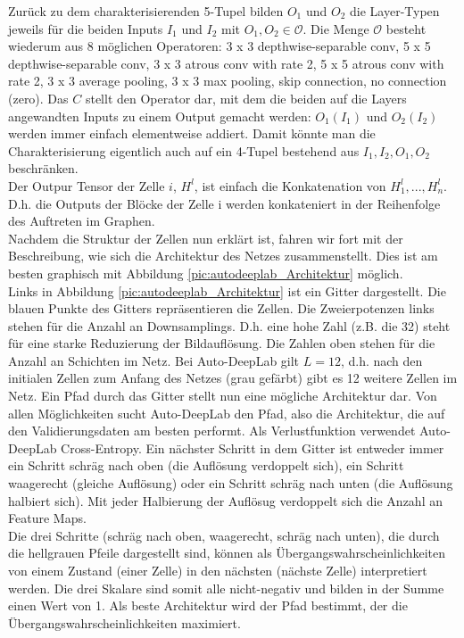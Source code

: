 Zurück zu dem charakterisierenden 5-Tupel bilden $O_1$ und $O_2$ die Layer-Typen jeweils für die beiden Inputs $I_1$ und $I_2$ mit $O_1, O_2 \in \mathcal{O}$. Die Menge $\mathcal{O}$ besteht wiederum aus 8 möglichen Operatoren: 3 x 3 depthwise-separable conv, 5 x 5 depthwise-separable conv, 3 x 3 atrous conv with rate 2, 5 x 5 atrous conv with rate 2, 3 x 3 average pooling, 3 x 3 max pooling, skip connection, no connection (zero). Das $C$ stellt den Operator dar, mit dem die beiden auf die Layers angewandten Inputs zu einem Output gemacht werden: $O_{1}(I_{1})$ und $O_{2}(I_{2})$ werden immer einfach elementweise addiert. Damit könnte man die Charakterisierung eigentlich auch auf ein 4-Tupel bestehend aus $I_1, I_2, O_1, O_2$ beschränken.\\
Der Outpur Tensor der Zelle $i$, $H^l$, ist einfach die Konkatenation von $H_{1}^{l}, ..., H_{n}^{l}$. D.h. die Outputs der Blöcke der Zelle i werden konkateniert in der Reihenfolge des Auftreten im Graphen.\\[0.3cm]
Nachdem die Struktur der Zellen nun erklärt ist, fahren wir fort mit der Beschreibung, wie sich die Architektur des Netzes zusammenstellt. Dies ist am besten graphisch mit Abbildung \ref{pic:autodeeplab_Architektur} möglich.\\
Links in Abbildung \ref{pic:autodeeplab_Architektur} ist ein Gitter dargestellt. Die blauen Punkte des Gitters repräsentieren die Zellen. Die Zweierpotenzen links stehen für die Anzahl an Downsamplings. D.h. eine hohe Zahl (z.B. die 32) steht für eine starke Reduzierung der Bildauflösung. Die Zahlen oben stehen für die Anzahl an Schichten im Netz. Bei Auto-DeepLab gilt $L=12$, d.h. nach den initialen Zellen zum Anfang des Netzes (grau gefärbt) gibt es 12 weitere Zellen im Netz. Ein Pfad durch das Gitter stellt nun eine mögliche Architektur dar. Von allen Möglichkeiten sucht Auto-DeepLab den Pfad, also die Architektur, die auf den Validierungsdaten am besten performt. Als Verlustfunktion verwendet Auto-DeepLab Cross-Entropy. Ein nächster Schritt in dem Gitter ist entweder immer ein Schritt schräg nach oben (die Auflösung verdoppelt sich), ein Schritt waagerecht (gleiche Auflösung) oder ein Schritt schräg nach unten (die Auflösung halbiert sich). Mit jeder Halbierung der Auflösug verdoppelt sich die Anzahl an Feature Maps.\\
Die drei Schritte (schräg nach oben, waagerecht, schräg nach unten), die durch die hellgrauen Pfeile dargestellt sind, können als Übergangswahrscheinlichkeiten von einem Zustand (einer Zelle) in den nächsten (nächste Zelle) interpretiert werden. Die drei Skalare sind somit alle nicht-negativ und bilden in der Summe einen Wert von 1. Als beste Architektur wird der Pfad bestimmt, der die Übergangswahrscheinlichkeiten maximiert.

